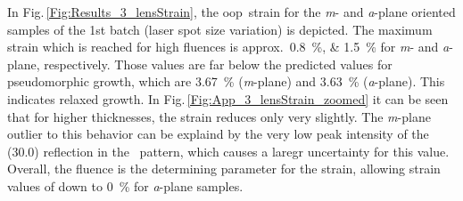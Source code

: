 In Fig.\,\ref{Fig:Results_3_lensStrain}, the \gls{oop}\ strain for the \textit{m}- and \textit{a}-plane oriented samples of the 1st batch (laser spot size variation) is depicted.
The maximum strain which is reached for high fluences is approx.\ \qtylist{0.8;1.5}{\percent} for \textit{m}- and \textit{a}-plane, respectively.
Those values are far below the predicted values for pseudomorphic growth, which are \qty{3.67}{\percent} (\textit{m}-plane) and \qty{3.63}{\percent} (\textit{a}-plane).
This indicates relaxed growth.
In Fig.\,\ref{Fig:App_3_lensStrain_zoomed} it can be seen that for higher thicknesses, the strain reduces only very slightly.
The \textit{m}-plane outlier to this behavior can be explaind by the very low peak intensity of the (30.0) reflection in the \thetaomega\ pattern, which causes a laregr uncertainty for this value.
Overall, the fluence is the determining parameter for the strain, allowing strain values of down to \qty{0}{\percent} for \textit{a}-plane samples.


